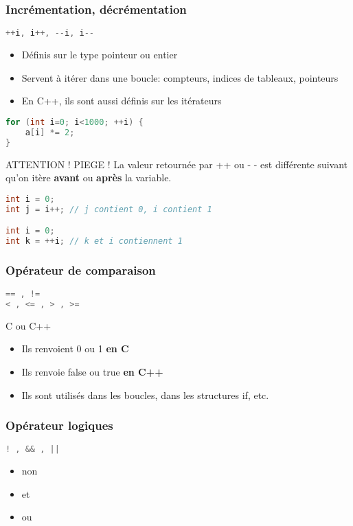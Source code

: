 \documentclass{beamer}
\begin{document}
\begin{frame}[fragile=singleslide,shrink=20]
\frametitle{Incrémentation, décrémentation}
\begin{lstlisting}[language=c++]
++i, i++, --i, i--
\end{lstlisting}

\begin{itemize}
\item{Définis sur le type pointeur ou entier}
\item{Servent à itérer dans une boucle: compteurs, indices de tableaux, pointeurs}
\item{En C++, ils sont aussi définis sur les itérateurs}
\end{itemize}
\begin{lstlisting}[language=c++]
for (int i=0; i<1000; ++i) {
    a[i] *= 2;
}
\end{lstlisting}

\begin{block}{ATTENTION ! PIEGE !}
La valeur retournée par ++ ou - - est différente suivant qu'on itère \textbf{avant} ou \textbf{après} la variable.
\begin{lstlisting}[language=c++]
int i = 0;
int j = i++; // j contient 0, i contient 1

int i = 0;
int k = ++i; // k et i contiennent 1
\end{lstlisting}
\end{block}
\end{frame}

\begin{frame}[fragile=singleslide,shrink=20]
\frametitle{Opérateur de comparaison}
\begin{lstlisting}[language=c++]
== , !=
< , <= , > , >=
\end{lstlisting}

\begin{block}{C ou C++}
\begin{itemize}
\item{Ils renvoient 0 ou 1 \textbf{en C}}
\item{Ils renvoie false ou true \textbf{en C++}}
\item{Ils sont utilisés dans les boucles, dans les structures if, etc.}
\end{itemize}
\end{block}
\end{frame}

\begin{frame}[fragile=singleslide,shrink=20]
\frametitle{Opérateur logiques}
\begin{lstlisting}[language=c++]
! , && , ||
\end{lstlisting}
\begin{itemize}
\item{non}
\item{et}
\item{ou}
\end{itemize}
\end{frame}
\end{document}
